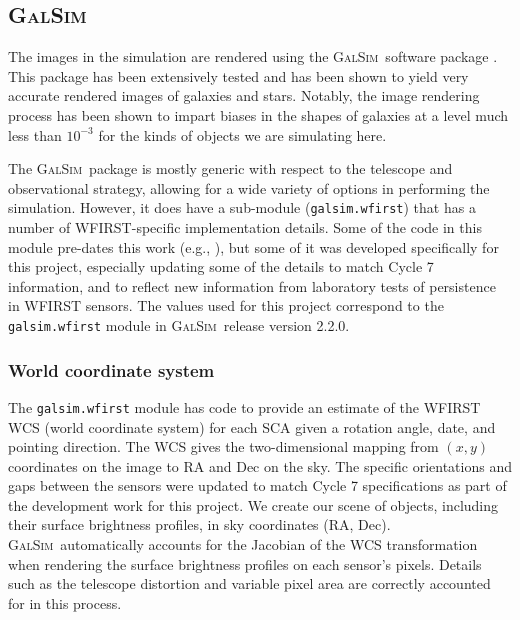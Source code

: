 \documentclass[usenatbib]{mnras}
\newcommand{\galsim}{\textsc{GalSim}}
\begin{document}
\subsection{\galsim}

The images in the simulation are rendered using the \galsim\ software package \citep{Rowe15}.  
This package has been extensively tested and has been shown to yield very accurate rendered images of galaxies and stars.
Notably, the image rendering process has been shown to impart biases in the shapes of galaxies at a level much less than $10^{-3}$ for the kinds of objects we are simulating here.  

The \galsim\ package is mostly generic with respect to the telescope and observational strategy, allowing for a wide variety of options in performing the simulation.
However, it does have a sub-module (\texttt{galsim.wfirst}) that has a number of WFIRST-specific implementation details.
Some of the code in this module pre-dates this work (e.g., \cite{2016PASP..128i5001K}), but some of it was developed specifically for this project, especially updating some of the details to match Cycle 7 information, and to reflect new information from laboratory tests of persistence in WFIRST sensors.  
The values used for this project correspond to the \texttt{galsim.wfirst} module in \galsim\ release version 2.2.0.

\subsubsection{World coordinate system}\label{wcs}

The \texttt{galsim.wfirst} module has code to provide an estimate of the WFIRST WCS (world coordinate system) for each SCA given a rotation angle, date, and pointing direction.  
The WCS gives the two-dimensional mapping from $(x,y)$ coordinates on the image to RA and Dec on the sky.
The specific orientations and gaps between the sensors were updated to match Cycle 7 specifications as part of the development work for this project.
We create our scene of objects, including their surface brightness profiles, in sky coordinates (RA, Dec).
\galsim\ automatically accounts for the Jacobian of the WCS transformation when rendering the surface brightness profiles on each sensor's pixels.  
Details such as the telescope distortion and variable pixel area are correctly accounted for in this process.
\end{document}

